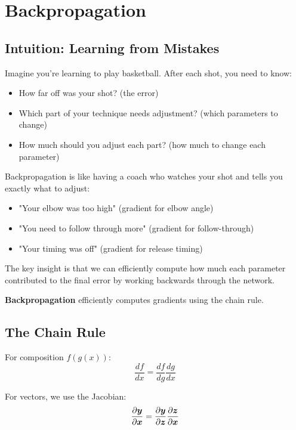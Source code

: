 
\section{Backpropagation}
\label{sec:backpropagation}

\subsection{Intuition: Learning from Mistakes}

Imagine you're learning to play basketball. After each shot, you need to know:
\begin{itemize}
    \item How far off was your shot? (the error)
    \item Which part of your technique needs adjustment? (which parameters to change)
    \item How much should you adjust each part? (how much to change each parameter)
\end{itemize}

Backpropagation is like having a coach who watches your shot and tells you exactly what to adjust:
\begin{itemize}
    \item "Your elbow was too high" (gradient for elbow angle)
    \item "You need to follow through more" (gradient for follow-through)
    \item "Your timing was off" (gradient for release timing)
\end{itemize}

The key insight is that we can efficiently compute how much each parameter contributed to the final error by working backwards through the network.

\textbf{Backpropagation} efficiently computes gradients using the chain rule.

\subsection{The Chain Rule}

For composition $f(g(x))$:
\begin{equation}
\frac{df}{dx} = \frac{df}{dg} \frac{dg}{dx}
\end{equation}

For vectors, we use the Jacobian:
\begin{equation}
\frac{\partial \boldsymbol{y}}{\partial \boldsymbol{x}} = \frac{\partial \boldsymbol{y}}{\partial \boldsymbol{z}} \frac{\partial \boldsymbol{z}}{\partial \boldsymbol{x}}
\end{equation}

